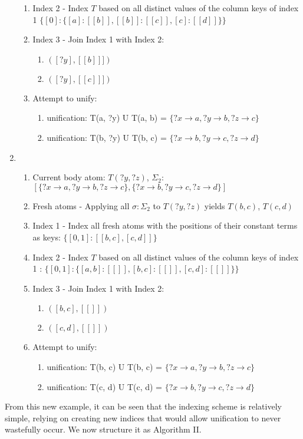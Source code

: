 \documentclass[sigconf,screen,review,natbib]{acmart}
\theoremstyle{definition}
\begin{document}
\begin{enumerate}
\begin{enumerate}
		      \item Index 2 - Index $T$ based on all distinct values of the column keys of index 1  $\{[0]: \{[a]: [[b]], [[b]]: [[c]], [c]: [[d]]\}\}$
		      \item Index 3 - Join Index 1 with Index 2:
		            \begin{enumerate}
			            \item $([?y], [[b]]])$
			            \item $([?y], [[c]]])$
		            \end{enumerate}
		      \item Attempt to unify:
		            \begin{enumerate}
			            \item unification: T(a, ?y) U T(a, b) = $\{?x \rightarrow a, ?y \rightarrow b, ?z \rightarrow c\}$
			            \item unification: T(b, ?y) U T(b, c) = $\{?x \rightarrow b, ?y \rightarrow c, ?z \rightarrow d\}$
		            \end{enumerate}
	      \end{enumerate}
	\item \begin{enumerate}
		      \item Current body atom: $T(?y, ?z)$, $\Sigma_2$: $[\{?x \rightarrow a, ?y \rightarrow b, ?z \rightarrow c\}, \{?x \rightarrow b, ?y \rightarrow c, ?z \rightarrow d\}]$
		      \item Fresh atoms - Applying all $\sigma : \Sigma_2$ to $T(?y, ?z)$ yields $T(b, c)$, $T(c, d)$
		      \item Index 1 - Index all fresh atoms with the positions of their constant terms as keys: $\{[0, 1] : [[b, c], [c, d]]\}$
		      \item Index 2 - Index $T$ based on all distinct values of the column keys of index 1 : $\{[0, 1]: \{[a, b]: [[]], [b, c]: [[]], [c, d]: [[]]\}\}$
		      \item Index 3 - Join Index 1 with Index 2:
		            \begin{enumerate}
			            \item $([b, c], [[]])$
			            \item $([c, d], [[]])$
		            \end{enumerate}
		      \item Attempt to unify:
		            \begin{enumerate}
			            \item unification: T(b, c) U T(b, c) = $\{?x \rightarrow a, ?y \rightarrow b, ?z \rightarrow c\}$
			            \item unification: T(c, d) U T(c, d) = $\{?x \rightarrow b, ?y \rightarrow c, ?z \rightarrow d\}$
		            \end{enumerate}
	      \end{enumerate}
\end{enumerate}
From this new example, it can be seen that the indexing scheme is relatively simple, relying on creating new indices that would allow unification
to never wastefully occur. We now structure it as Algorithm II.
\end{document}
